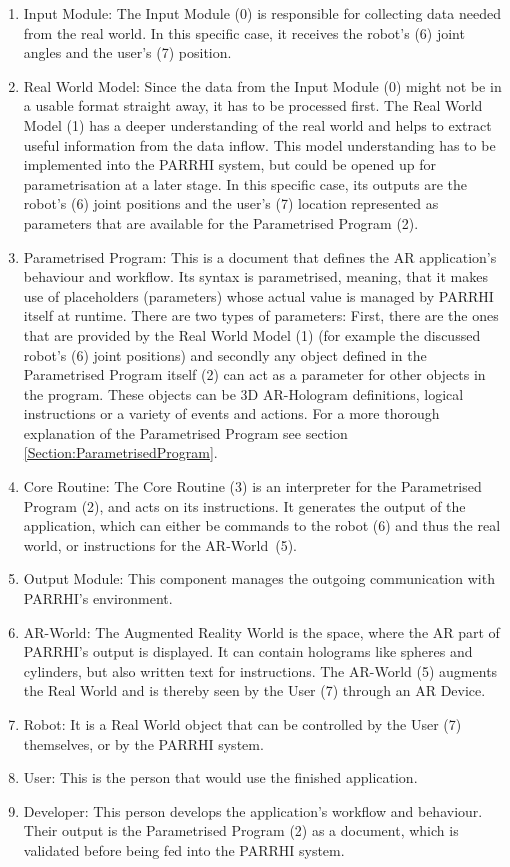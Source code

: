 \begin{enumerate}
	\addtocounter{enumi}{-1}
	\setlength\itemsep{-1em}
	\item Input Module: The Input Module (0) is responsible for collecting data needed from the real world. In this specific case, it receives the robot's (6) joint angles and the user's (7) position.
	\item Real World Model: Since the data from the Input Module (0) might not be in a usable format straight away, it has to be processed first. The Real World Model (1) has a deeper understanding of the real world and helps to extract useful information from the data inflow. This model understanding has to be implemented into the PARRHI system, but could be opened up for parametrisation at a later stage. In this specific case, its outputs are the robot's (6) joint positions and the user's (7) location represented as parameters that are available for the Parametrised Program (2).
	\item Parametrised Program: This is a document that defines the AR application's behaviour and workflow. Its syntax is parametrised, meaning, that it makes use of placeholders (parameters) whose actual value is managed by PARRHI itself at runtime. There are two types of parameters: First, there are the ones that are provided by the Real World Model (1) (for example the discussed robot's (6) joint positions) and secondly any object defined in the Parametrised Program itself (2) can act as a parameter for other objects in the program. These objects can be 3D AR-Hologram definitions, logical instructions or a variety of events and actions. For a more thorough explanation of the Parametrised Program see section \ref{Section:ParametrisedProgram}.
	\item Core Routine: The Core Routine (3) is an interpreter for the Parametrised Program (2), and acts on its instructions. It generates the output of the application, which can either be commands to the robot (6) and thus the real world, or instructions for the AR-World~(5).
	\item Output Module: This component manages the outgoing communication with PARRHI's environment. 
	\item AR-World: The Augmented Reality World is the space, where the AR part of PARRHI's output is displayed. It can contain holograms like spheres and cylinders, but also written text for instructions. The AR-World (5) augments the Real World and is thereby seen by the User (7) through an AR Device.
	\item Robot: It is a Real World object that can be controlled by the User (7) themselves, or by the PARRHI system.
	\item User: This is the person that would use the finished application.
	\item Developer: This person develops the application's workflow and behaviour. Their output is the Parametrised Program (2) as a document, which is validated before being fed into the PARRHI system.
\end{enumerate}

